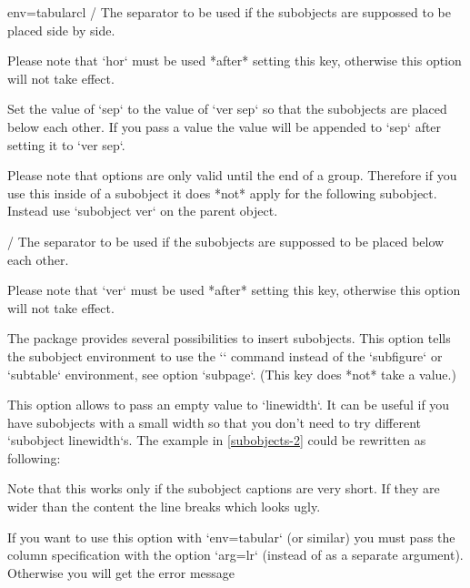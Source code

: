 \begin{tableobject}{env=tabular}{cl}
 /
  The separator to be used if the subobjects are suppossed to be placed side by side.

  Please note that `hor` must be used *after* setting this key, otherwise this option will not take effect.

  Set the value of `sep` to the value of `ver sep` so that the subobjects are placed below each other.
  If you pass a value the value will be appended to `sep` after setting it to `ver sep`.

  Please note that options are only valid until the end of a group.
  Therefore if you use this inside of a subobject it does *not* apply for the following subobject.
  Instead use `subobject ver` on the parent object.

 /
  The separator to be used if the subobjects are suppossed to be placed below each other.

  Please note that `ver` must be used *after* setting this key, otherwise this option will not take effect.

\bigpar

  The  package provides several possibilities to insert subobjects.
  This option tells the subobject environment to use the `\subcaptionbox` command instead of the `subfigure` or `subtable` environment, see option `subpage`.
  (This key does *not* take a value.)

  This option allows to pass an empty value to `linewidth`.
  It can be useful if you have subobjects with a small width
  so that you don't need to try different `subobject linewidth`s.
  The example in \cref{subobjects-2} could be rewritten as following:


  Note that this works only if the subobject captions are very short.
  If they are wider than the content the line breaks which looks ugly.

  If you want to use this option with `env=tabular` (or similar) you must pass the column specification with the option `arg=lr` (instead of as a separate argument).
  Otherwise you will get the error message 


\end{tableobject}
